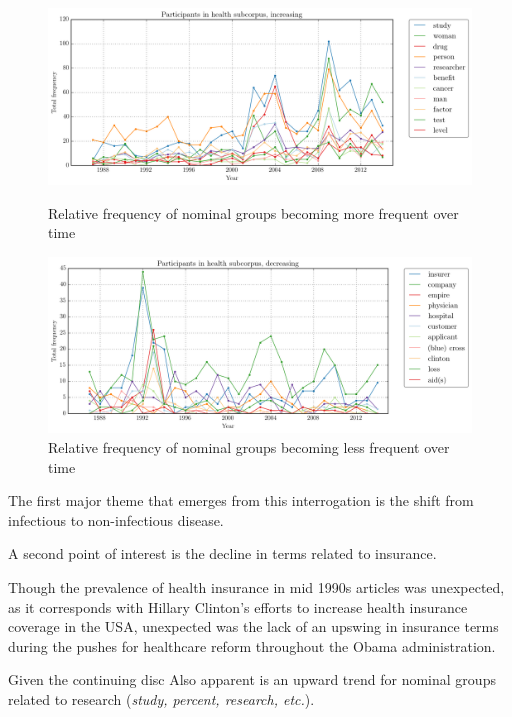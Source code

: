     \begin{figure}[htb!]
    \centering
    \begin{minipage}{.48\textwidth}
    \centering
    \includegraphics[width=.95\textwidth]{../images/3.png}
    \caption{Relative frequency of nominal groups becoming more frequent over time}
    \label{fig:3}
    \end{minipage}%
    \begin{minipage}{.48\textwidth}
    \centering
    \includegraphics[width=.95\textwidth]{../images/4.png}
    \caption{Relative frequency of nominal groups becoming less frequent over time}
    \label{fig:4}
    \end{minipage}
    \end{figure}

The first major theme that emerges from this interrogation is the shift from infectious to non-infectious disease.

A second point of interest is the decline in terms related to insurance.

Though the prevalence of health insurance in mid 1990s articles was unexpected, as it corresponds with Hillary Clinton's efforts to increase health insurance coverage in the USA, unexpected was the lack of an upswing in insurance terms during the pushes for healthcare reform throughout the Obama administration.



Given the continuing disc
Also apparent is an upward trend for nominal groups related to research (\emph{study, percent, research, etc.}).

